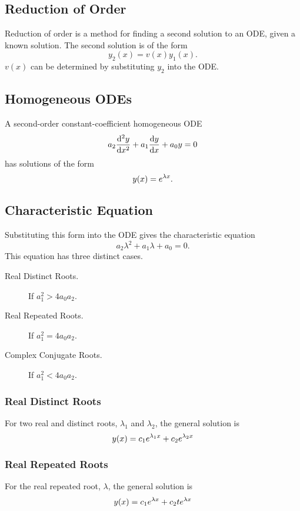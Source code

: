\documentclass{article}
\begin{document}
\subsection{Reduction of Order}
Reduction of order is a method for finding a second solution
to an ODE, given a known solution.
The second solution is of the form
\begin{equation*}
    y_2(x) = v\left(x\right) y_1(x).
\end{equation*}
$v(x)$ can be determined by substituting $y_2$ into the ODE.
\subsection{Homogeneous ODEs}
A second-order constant-coefficient homogeneous ODE
\begin{equation*}
    a_2\dv[2]{y}{x} + a_1\dv{y}{x} + a_0y = 0
\end{equation*}
has solutions of the form
\begin{equation*}
    y(x) = e^{\lambda x}.
\end{equation*}
\subsection{Characteristic Equation}
Substituting this form into the ODE gives the characteristic equation
\begin{equation*}
    a_2\lambda^2 + a_1\lambda + a_0 = 0.
\end{equation*}
This equation has three distinct cases.
\begin{description}
    \item[Real Distinct Roots.] If $a_1^2 > 4a_0a_2$.
    \item[Real Repeated Roots.] If $a_1^2 = 4a_0a_2$.
    \item[Complex Conjugate Roots.] If $a_1^2 < 4a_0a_2$.
\end{description}
\subsubsection{Real Distinct Roots}
For two real and distinct roots, $\lambda_1$ and $\lambda_2$, the general solution is
\begin{equation*}
    y(x) = c_1e^{\lambda_1 x} + c_2e^{\lambda_2 x}
\end{equation*}
\subsubsection{Real Repeated Roots}
For the real repeated root, $\lambda$, the general solution is
\begin{equation*}
    y(x) = c_1e^{\lambda x} + c_2 te^{\lambda x}
\end{equation*}
\end{document}
